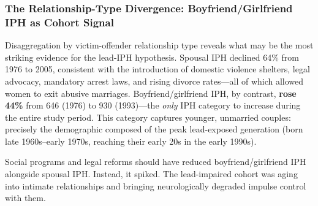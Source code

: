 \documentclass[12pt,openany]{book}
\begin{document}
\subsubsection{The Relationship-Type Divergence: Boyfriend/Girlfriend IPH as Cohort Signal}

Disaggregation by victim-offender relationship type reveals what may be the most striking evidence for the lead-IPH hypothesis. Spousal IPH declined 64\% from 1976 to 2005, consistent with the introduction of domestic violence shelters, legal advocacy, mandatory arrest laws, and rising divorce rates---all of which allowed women to exit abusive marriages. Boyfriend/girlfriend IPH, by contrast, \textbf{rose 44\%} from 646 (1976) to 930 (1993)---the \textit{only} IPH category to increase during the entire study period. This category captures younger, unmarried couples: precisely the demographic composed of the peak lead-exposed generation (born late 1960s--early 1970s, reaching their early 20s in the early 1990s).

Social programs and legal reforms should have reduced boyfriend/girlfriend IPH alongside spousal IPH. Instead, it spiked. The lead-impaired cohort was aging into intimate relationships and bringing neurologically degraded impulse control with them.
\end{document}
